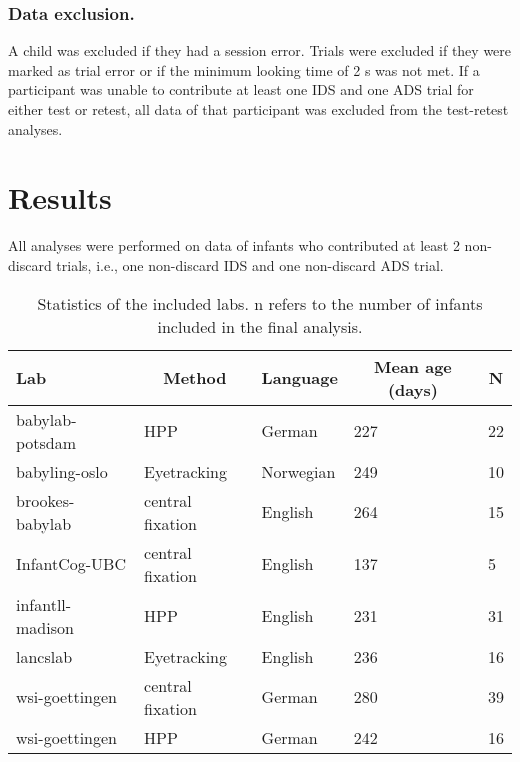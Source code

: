 \documentclass[
  english,
  man,floatsintext]{apa6}
\begin{document}
\hypertarget{data-exclusion.}{%
\subsubsection{Data exclusion.}\label{data-exclusion.}}

A child was excluded if they had a session error. Trials were excluded if they were marked as trial error or if the minimum looking time of 2 s was not met. If a participant was unable to contribute at least one IDS and one ADS trial for either test or retest, all data of that participant was excluded from the test-retest analyses.

\hypertarget{results}{%
\section{Results}\label{results}}

All analyses were performed on data of infants who contributed at least 2 non-discard trials, i.e., one non-discard IDS and one non-discard ADS trial.

\begin{table}[tbp]

\begin{center}
\begin{threeparttable}

\caption{\label{tab:labs}Statistics of the included labs. n refers to the number of infants included in the final analysis.}

\begin{tabular}{lllll}
\toprule
Lab & \multicolumn{1}{c}{Method} & \multicolumn{1}{c}{Language} & \multicolumn{1}{c}{Mean age (days)} & \multicolumn{1}{c}{N}\\
\midrule
babylab-potsdam & HPP & German & 227 & 22\\
babyling-oslo & Eyetracking & Norwegian & 249 & 10\\
brookes-babylab & central fixation & English & 264 & 15\\
InfantCog-UBC & central fixation & English & 137 & 5\\
infantll-madison & HPP & English & 231 & 31\\
lancslab & Eyetracking & English & 236 & 16\\
wsi-goettingen & central fixation & German & 280 & 39\\
wsi-goettingen & HPP & German & 242 & 16\\
\bottomrule
\end{tabular}

\end{threeparttable}
\end{center}

\end{table}
\end{document}

